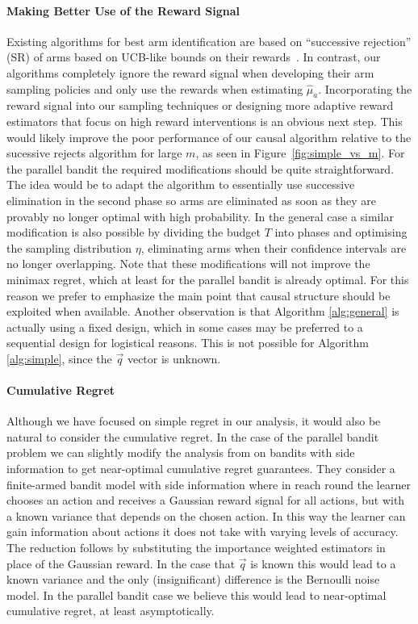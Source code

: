 \paragraph{Making Better Use of the Reward Signal}
Existing algorithms for best arm identification are based on ``successive rejection'' (SR) of arms based on UCB-like bounds on their rewards~\citep{Even-Dar2002}.
In contrast, our algorithms completely ignore the reward signal when developing their arm sampling policies and only use the rewards when estimating $\hat{\mu}_a$.
Incorporating the reward signal into our sampling techniques or designing more adaptive reward estimators that focus on high reward interventions is an obvious next step.
This would likely improve the poor performance of our causal algorithm relative to the sucessive rejects algorithm for large $m$, as seen in Figure~\ref{fig:simple_vs_m}.
For the parallel bandit the required modifications should be quite straightforward. The idea would be to adapt the algorithm to essentially use successive elimination in
the second phase so arms are eliminated as soon as they are provably no longer optimal with high probability. In the general case a similar modification is also possible
by dividing the budget $T$ into phases and optimising the sampling distribution $\eta$, eliminating arms when their confidence intervals are no longer overlapping. Note
that these modifications will not improve the minimax regret, which at least for the parallel bandit is already optimal. For this reason we prefer to emphasize 
the main point that causal structure should be exploited when available. Another observation is that Algorithm \ref{alg:general} is actually using a fixed design, which
in some cases may be preferred to a sequential design for logistical reasons. This is not possible for Algorithm \ref{alg:simple}, since the $\vec{q}$ vector is unknown.

\paragraph{Cumulative Regret}
Although we have focused on simple regret in our analysis, it would also be natural to consider the cumulative regret.
In the case of the parallel bandit problem we can slightly modify the analysis from \citep{wu2015online} on bandits with side information 
to get near-optimal cumulative regret guarantees. They consider a finite-armed bandit model with side information where in reach round
the learner chooses an action and receives a Gaussian reward signal for all actions, but with a known variance that depends on the chosen action.
In this way the learner can gain information about actions it does not take with varying levels of accuracy. The reduction follows by substituting
the importance weighted estimators in place of the Gaussian reward. In the case that $\vec{q}$ is known this would lead to a known variance
and the only (insignificant) difference is the Bernoulli noise model. In the parallel bandit case we believe this would lead to near-optimal cumulative regret,
at least asymptotically. 

